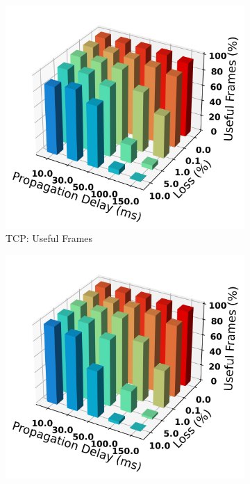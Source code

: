 \documentclass{mpaper}
\begin{document}
\begin{figure}
  \centering
  \begin{subfigure}[b]{0.25\textwidth}
      \centering
      \includegraphics[width=\textwidth]{Frame_Usefulness_Ratio/TCP/AVG_Frame_Usefulness-168.png}
      \caption{TCP: Useful Frames}
      \label{fig:TCP_bar-168}
  \end{subfigure}
  \hfill
  \begin{subfigure}[b]{0.25\textwidth}
      \centering
      \includegraphics[width=\textwidth]{Frame_Usefulness_Ratio/QUIC_SS/AVG_Frame_Usefulness-168.png}

\end{subfigure}
\end{figure}
\end{document}
